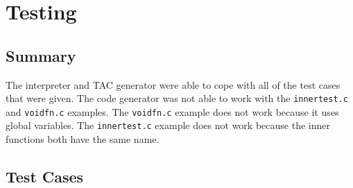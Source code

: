 \chapter{Testing}

\section{Summary}
The interpreter and TAC generator were able to cope with all of the test cases that were given. The code generator was not able to work with the \verb!innertest.c! and \verb!voidfn.c! examples. The \verb!voidfn.c! example does not work because it uses global variables. The \verb!innertest.c! example does not work because the inner functions both have the same name.

\section{Test Cases}
\newpage
\newpage
\newpage
\newpage
\newpage
\newpage
\newpage
\newpage
\newpage
\newpage
\newpage
\newpage
\newpage
\newpage
\newpage
\newpage
\newpage
\newpage
\newpage
\newpage
\newpage
\newpage
